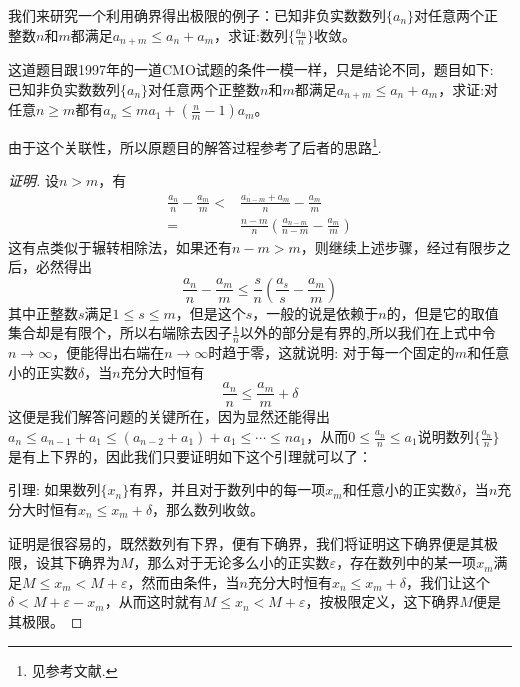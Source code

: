 \begin{example}
  我们来研究一个利用确界得出极限的例子：已知非负实数数列$\{a_n\}$对任意两个正整数$n$和$m$都满足$a_{n+m} \leqslant a_n+a_m$，求证:数列$\{\frac{a_n}{n}\}$收敛。

这道题目跟1997年的一道CMO试题的条件一模一样，只是结论不同，题目如下: 已知非负实数数列$\{a_n\}$对任意两个正整数$n$和$m$都满足$a_{n+m} \leqslant a_n+a_m$，求证:对任意$n \geqslant m$都有$a_n \leqslant ma_1+\left( \frac{n}{m}-1\right)a_m$。

由于这个关联性，所以原题目的解答过程参考了后者的思路\footnote{见参考文献\cite{olympic-math}.}.

\begin{proof}[证明]
设$n>m$，有
\begin{align*}
\frac{a_n}{n} - \frac{a_m}{m} < & \frac{a_{n-m}+a_m}{n} - \frac{a_m}{m} \\
 = & \frac{n-m}{n} \left( \frac{a_{n-m}}{n-m} - \frac{a_m}{m} \right)
\end{align*}
这有点类似于辗转相除法，如果还有$n-m>m$，则继续上述步骤，经过有限步之后，必然得出
\[ \frac{a_n}{n} - \frac{a_m}{m} \leqslant \frac{s}{n} \left( \frac{a_s}{s} - \frac{a_m}{m} \right) \]
其中正整数$s$满足$1 \leqslant s \leqslant m$，但是这个$s$，一般的说是依赖于$n$的，但是它的取值集合却是有限个，所以右端除去因子$\frac{1}{n}$以外的部分是有界的,所以我们在上式中令$n \to \infty$，便能得出右端在$n \to \infty$时趋于零，这就说明: 对于每一个固定的$m$和任意小的正实数$\delta$，当$n$充分大时恒有
\[ \frac{a_n}{n} \leqslant \frac{a_m}{m} + \delta \]
这便是我们解答问题的关键所在，因为显然还能得出$a_n \leqslant a_{n-1}+a_1 \leqslant (a_{n-2}+a_1)+a_1 \leqslant \cdots \leqslant na_1$，从而$0 \leqslant \frac{a_n}{n} \leqslant a_1$说明数列$\{\frac{a_n}{n}\}$是有上下界的，因此我们只要证明如下这个引理就可以了：

引理: 如果数列$\{ x_n \}$有界，并且对于数列中的每一项$x_m$和任意小的正实数$\delta$，当$n$充分大时恒有$x_n \leqslant x_m+\delta$，那么数列收敛。

证明是很容易的，既然数列有下界，便有下确界，我们将证明这下确界便是其极限，设其下确界为$M$，那么对于无论多么小的正实数$\varepsilon$，存在数列中的某一项$x_m$满足$M \leqslant x_m  < M+\varepsilon$，然而由条件，当$n$充分大时恒有$x_n \leqslant x_m+\delta$，我们让这个$\delta<M+\varepsilon-x_m$，从而这时就有$M \leqslant x_n  < M+\varepsilon$，按极限定义，这下确界$M$便是其极限。
\end{proof}
\end{example}





